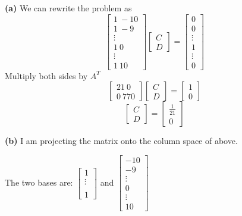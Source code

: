 \documentclass[11pt]{article}
\renewcommand\part[1]{\vspace{.10in}\textbf{(#1)}}
\begin{document}
\part{a} We can rewrite the problem as
$$\begin{bmatrix} 1 \ -10 \\ 1 \ -9 \\ \vdots \\ 1 \ 0 \\ \vdots \\ 1 \ 10 \end{bmatrix}\begin{bmatrix} C \\ D \end{bmatrix} = \begin{bmatrix} 0 \\ 0 \\ \vdots \\ 1 \\ \vdots \\ 0 \end{bmatrix}$$
Multiply both sides by \(A^T\)
$$\begin{bmatrix} 21 \ 0 \\ 0 \ 770 \end{bmatrix}\begin{bmatrix} C \\ D \end{bmatrix} = \begin{bmatrix} 1 \\ 0 \end{bmatrix}$$
$$\begin{bmatrix} C \\ D \end{bmatrix} = \begin{bmatrix} \frac{1}{21} \\ 0 \end{bmatrix}$$

\part{b} I am projecting the matrix onto the column space of above. 

The two bases are:
\(\begin{bmatrix} 1 \\ \vdots \\  \\ 1 \end{bmatrix}\) and \(\begin{bmatrix} -10 \\ -9 \\ \vdots \\ 0 \\ \vdots \\ 10 \end{bmatrix}\)
\end{document}
